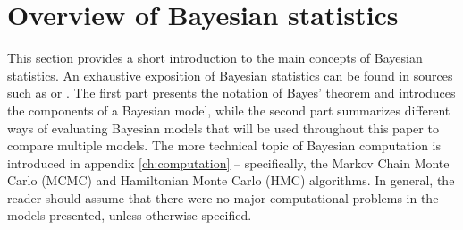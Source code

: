 \section{Overview of Bayesian statistics}

This section provides a short introduction to the main concepts of Bayesian statistics.
An exhaustive exposition of Bayesian statistics can be found in sources such as \cite{gelman_bayesian_2014} or \cite{mcelreath_statistical_2020}.
The first part presents the notation of Bayes' theorem and introduces the components of a Bayesian model, while the second part summarizes different ways of evaluating Bayesian models that will be used throughout this paper to compare multiple models.
The more technical topic of Bayesian computation is introduced in appendix \ref{ch:computation} – specifically, the Markov Chain Monte Carlo (MCMC) and Hamiltonian Monte Carlo (HMC) algorithms.
In general, the reader should assume that there were no major computational problems in the models presented, unless otherwise specified.




